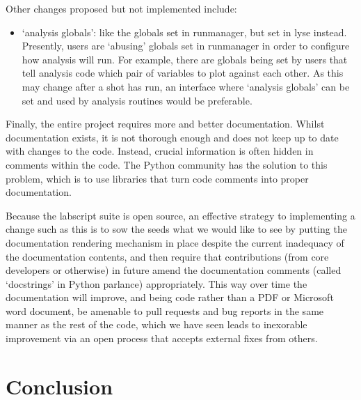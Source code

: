 Other changes proposed but not implemented include:

\begin{itemize}
\item `analysis globals': like the globals set in runmanager, but set in lyse instead. Presently, users are `abusing' globals set in runmanager in order to configure how analysis will run. For example, there are globals being set by users that tell analysis code which pair of variables to plot against each other. As this may change after a shot has run, an interface where `analysis globals' can be set and used by analysis routines would be preferable.
\end{itemize}

Finally, the entire project requires more and better documentation. Whilst documentation exists, it is not thorough enough and does not keep up to date with changes to the code. Instead, crucial information is often hidden in comments within the code. The Python community has the solution to this problem, which is to use libraries that turn code comments into proper documentation.

Because the labscript suite is open source, an effective strategy to implementing a change such as this is to sow the seeds what we would like to see by putting the documentation rendering mechanism in place despite the current inadequacy of the documentation contents, and then require that contributions (from core developers or otherwise) in future amend the documentation comments (called `docstrings' in Python parlance) appropriately. This way over time the documentation will improve, and being code rather than a PDF or Microsoft word document, be amenable to pull requests and bug reports in the same manner as the rest of the code, which we have seen leads to inexorable improvement via an open process that accepts external fixes from others.

\section{Conclusion}

